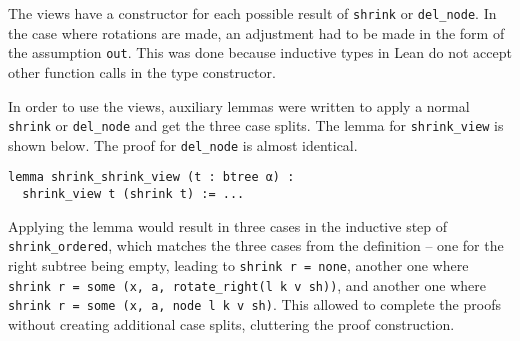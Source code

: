 The views have a constructor for each possible result of \lstinline{shrink} or \lstinline{del_node}. In the case where rotations are made, an adjustment had to be made in the form of the assumption \lstinline{out}. This was done because inductive types in Lean do not accept other function calls in the type constructor.

In order to use the views, auxiliary lemmas were written to apply a normal \lstinline{shrink} or \lstinline{del_node} and get the three case splits. The lemma for \lstinline{shrink_view} is shown below. The proof for \lstinline{del_node} is almost identical.

\begin{lstlisting}
lemma shrink_shrink_view (t : btree α) : 
  shrink_view t (shrink t) := ...
\end{lstlisting}

Applying the lemma would result in three cases in the inductive step of \lstinline{shrink_ordered}, which matches the three cases from the definition -- one for the right subtree being empty, leading to \lstinline{shrink r = none}, another one where \lstinline{shrink r = some (x, a, rotate_right(l k v sh))}, and another one where \lstinline{shrink r = some (x, a, node l k v sh)}. This allowed to complete the proofs without creating additional case splits, cluttering the proof construction.